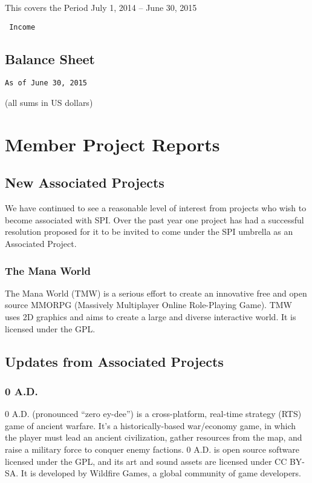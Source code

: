 \documentclass[letterpaper]{report}
\begin{document}
This covers the Period July 1, 2014 -- June 30, 2015

\begin{verbatim}
 Income
\end{verbatim}

\section{Balance Sheet}

\begin{verbatim}
As of June 30, 2015
\end{verbatim}

(all sums in US dollars)


\chapter{Member Project Reports}

\section{New Associated Projects}

We have continued to see a reasonable level of interest from projects who wish
to become associated with SPI.  Over the past year one project has had
a successful resolution proposed for it to be invited to come under the SPI
umbrella as an Associated Project.


\subsection{The Mana World}

The Mana World (TMW) is a serious effort to create an innovative free and
open source MMORPG (Massively Multiplayer Online Role-Playing Game).  TMW
uses 2D graphics and aims to create a large and diverse interactive world.
It is licensed under the GPL.

\section{Updates from Associated Projects}

\subsection{0 A.D.}

0 A.D. (pronounced ``zero ey-dee'') is a cross-platform, real-time strategy
(RTS) game of ancient warfare. It's a historically-based war/economy game,
in which the player must lead an ancient civilization, gather resources
from the map, and raise a military force to conquer enemy factions. 0 A.D.
is open source software licensed under the GPL, and its art and sound
assets are licensed under CC BY-SA. It is developed by Wildfire Games, a
global community of game developers.
\end{document}
